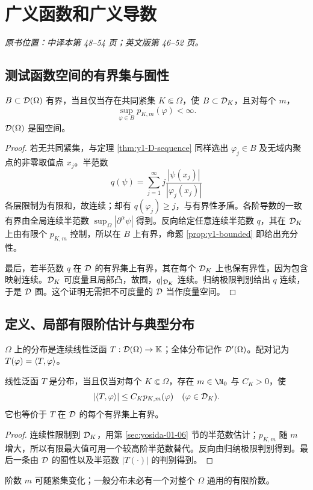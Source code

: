 \section{广义函数和广义导数}\label{sec:yosida-01-08}
\noindent\textit{原书位置：中译本第 48--54 页；英文版第 46--52 页。}

\subsection{测试函数空间的有界集与囿性}
\begin{theorem}[测试空间有界集的完整刻画]\label{thm:y1-D-bounded}
$B\subset\mathcal{D}(\Omega)$ 有界，当且仅当存在共同紧集 $K\Subset\Omega$，使 $B\subset\mathcal{D}_K$，且对每个 $m$，
\[
 \sup_{\varphi\in B}p_{K,m}(\varphi)<\infty.
\]
$\mathcal{D}(\Omega)$ 是囿空间。
\end{theorem}
\begin{proof}
若无共同紧集，与定理 \ref{thm:y1-D-sequence} 同样选出 $\varphi_j\in B$ 及无域内聚点的非零取值点 $x_j$。半范数
\[
 q(\psi)=\sum_{j=1}^\infty j\frac{|\psi(x_j)|}{|\varphi_j(x_j)|}
\]
各层限制为有限和，故连续；却有 $q(\varphi_j)\ge j$，与有界性矛盾。各阶导数的一致有界由全局连续半范数 $\sup_\Omega|\partial^\alpha\psi|$ 得到。反向给定任意连续半范数 $q$，其在 $\mathcal{D}_K$ 上由有限个 $p_{K,m}$ 控制，所以在 $B$ 上有界，命题 \ref{prop:y1-bounded} 即给出充分性。

最后，若半范数 $q$ 在 $\mathcal{D}$ 的有界集上有界，其在每个 $\mathcal{D}_K$ 上也保有界性，因为包含映射连续。$\mathcal{D}_K$ 可度量且局部凸，故囿，$q|_{\mathcal{D}_K}$ 连续。归纳极限判别给出 $q$ 连续，于是 $\mathcal{D}$ 囿。这个证明无需把不可度量的 $\mathcal{D}$ 当作度量空间。
\end{proof}

\subsection{定义、局部有限阶估计与典型分布}
\begin{definition}[广义函数或分布]
$\Omega$ 上的分布是连续线性泛函 $T:\mathcal{D}(\Omega)\to\mathbb K$；全体分布记作 $\mathcal{D}'(\Omega)$。配对记为 $T(\varphi)=\langle T,\varphi\rangle$。
\end{definition}
\begin{theorem}[分布的局部有限阶判别]\label{thm:y1-distribution-estimate}
线性泛函 $T$ 是分布，当且仅当对每个 $K\Subset\Omega$，存在 $m\in\N_0$ 与 $C_K>0$，使
\[
 |\langle T,\varphi\rangle|\le C_Kp_{K,m}(\varphi)\quad(\varphi\in\mathcal{D}_K).
\]
它也等价于 $T$ 在 $\mathcal{D}$ 的每个有界集上有界。
\end{theorem}
\begin{proof}
连续性限制到 $\mathcal{D}_K$，用第 \ref{sec:yosida-01-06} 节的半范数估计；$p_{K,m}$ 随 $m$ 增大，所以有限最大值可用一个较高阶半范数替代。反向由归纳极限判别得到。最后一条由 $\mathcal{D}$ 的囿性以及半范数 $|T(\cdot)|$ 的判别得到。
\end{proof}
阶数 $m$ 可随紧集变化；一般分布未必有一个对整个 $\Omega$ 通用的有限阶数。

